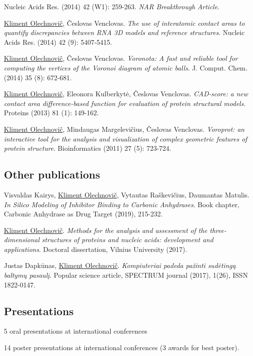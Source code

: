 \documentclass{article}
\newenvironment{enumerate_tight}{
\begin{enumerate}
  \setlength{\itemsep}{4pt}
  \setlength{\parskip}{0pt}
  \setlength{\parsep}{0pt}
}{\end{enumerate}}
\newenvironment{itemize_tight}{
\begin{itemize}
  \setlength{\itemsep}{4pt}
  \setlength{\parskip}{0pt}
  \setlength{\parsep}{0pt}
}{\end{itemize}}
\begin{document}
\begin{enumerate_tight}
        Nucleic Acids Res. (2014) 42 (W1): 259-263. \emph{NAR Breakthrough Article}.
  \item \underline{Kliment Olechnovič}, Česlovas Venclovas.
        \emph{The use of interatomic contact areas to quantify discrepancies between RNA 3D models and reference structures}.
        Nucleic Acids Res. (2014) 42 (9): 5407-5415.
  \item \underline{Kliment Olechnovič}, Česlovas Venclovas.
        \emph{Voronota: A fast and reliable tool for computing the vertices of the Voronoi diagram of atomic balls}.
        J. Comput. Chem. (2014) 35 (8): 672-681.
  \item \underline{Kliment Olechnovič}, Eleonora Kulberkytė, Česlovas Venclovas.
        \emph{CAD-score: a new contact area difference-based function for evaluation of protein structural models}.
        Proteins (2013) 81 (1): 149-162.
  \item \underline{Kliment Olechnovič}, Mindaugas Margelevičius, Česlovas Venclovas.
        \emph{Voroprot: an interactive tool for the analysis and visualization of complex geometric features of protein structure}.
        Bioinformatics (2011) 27 (5): 723-724.
\end{enumerate_tight}

\subsection*{Other publications}
\begin{itemize_tight}
  \item Visvaldas Kairys, \underline{Kliment Olechnovič}, Vytautas Raškevičius, Daumantas Matulis.
        \emph{In Silico Modeling of Inhibitor Binding to Carbonic Anhydrases}.
        Book chapter, Carbonic Anhydrase as Drug Target (2019), 215-232.
  \item \underline{Kliment Olechnovič}.
        \emph{Methods for the analysis and assessment of the three-dimensional structures of proteins and nucleic acids: development and applications}.
        Doctoral dissertation, Vilnius University (2017).
  \item Justas Dapkūnas, \underline{Kliment Olechnovič}.
        \emph{Kompiuteriai padeda pažinti sudėtingą baltymų pasaulį}.
        Popular science article, SPECTRUM journal (2017), 1(26), ISSN 1822-0147.
\end{itemize_tight}

\subsection*{Presentations}
\begin{itemize_tight}
  \item 5 oral presentations at international conferences
  \item 14 poster presentations at international conferences (3 awards for best poster).
\end{itemize_tight}
\end{document}
